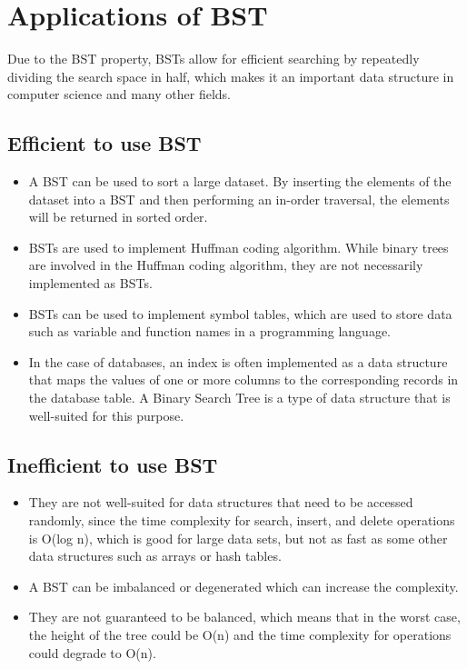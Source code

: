 \documentclass[11pt]{article}
\begin{document}

\section{Applications of BST}
    Due to the BST property, BSTs allow for efficient searching by repeatedly dividing the search space in half, which makes it an important data structure in computer science and many other fields.
    \subsection{Efficient to use BST}
    \begin{itemize}
        \item A BST can be used to sort a large dataset. By inserting the elements of the dataset into a BST and then performing an in-order traversal, the elements will be returned in sorted order.

        \item BSTs are used to implement Huffman coding algorithm. While binary trees are involved in the Huffman coding algorithm, they are not necessarily implemented as BSTs.

        \item BSTs can be used to implement symbol tables, which are used to store data such as variable and function names in a programming language. 

        \item In the case of databases, an index is often implemented as a data structure that maps the values of one or more columns to the corresponding records in the database table. A Binary Search Tree is a type of data structure that is well-suited for this purpose.
    \end{itemize}
    \subsection{Inefficient to use BST}
    \begin{itemize}
        \item They are not well-suited for data structures that need to be accessed randomly, since the time complexity for search, insert, and delete operations is O(log n), which is good for large data sets, but not as fast as some other data structures such as arrays or hash tables.

        \item A BST can be imbalanced or degenerated which can increase the complexity.

        \item They are not guaranteed to be balanced, which means that in the worst case, the height of the tree could be O(n) and the time complexity for operations could degrade to O(n). 
    \end{itemize}
\end{document}
